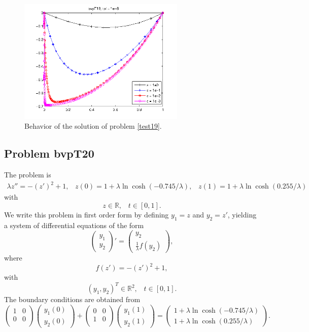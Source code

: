 \documentclass[<options>]{article}
\def \RR {{\mathbb{R}}}
\begin{document}
\begin{figure}[htb]
\centerline{\includegraphics[height=6cm]{Prob19}}
\caption{Behavior of the solution of problem \ref{test19}.}
\end{figure}
\newpage
\subsection{Problem bvpT20}\label{test20}
The problem is 
\begin{eqnarray*}
\lambda z'' =  -(z')^{2} + 1, \;\;\;z(0) = 1 +\lambda \ln \cosh(-0.745 /\lambda), \;\;\; z(1) =1 +\lambda \ln \cosh(0.255 /\lambda)
\end{eqnarray*}
with
\[
z \in \RR, \;\;\; t\in [0,1].
\]
We write this problem in first order form by defining $y_1=z$ and $y_2=z'$, yielding a system of differential equations of the form
\begin{equation*}
\left(\begin{array}{c}
y_1\\
y_2
\end{array}\right)'=
\left(\begin{array}{c}
y_2\\
\frac{1}{\lambda}f(y_2)
\end{array}\right),
\end{equation*}
where
\begin{equation*}
 f(z') = -(z')^{2} + 1,
\end{equation*}
with
\[
(y_1,y_2)^T \in \RR^{2}, \;\;\;  t \in [0,1].
\]
The  boundary conditions are obtained from
\begin{equation*}
\left(
  \begin{array}{cc}
    1 & 0 \\
    0 & 0 \\
  \end{array}
\right)
\left(\begin{array}{c}
y_{1}(0)\\
y_{2}(0)
\end{array}\right)
+
\left(
  \begin{array}{cc}
    0 & 0 \\
    1 & 0 \\
  \end{array}
\right)
\left(\begin{array}{c}
y_{1}(1)\\
y_{2}(1)
\end{array}\right)=\left(\begin{array}{c}
1 +\lambda \ln \cosh(-0.745 /\lambda) \\
1 +\lambda \ln \cosh(0.255 /\lambda)
\end{array}\right).
\end{equation*}
\end{document}
